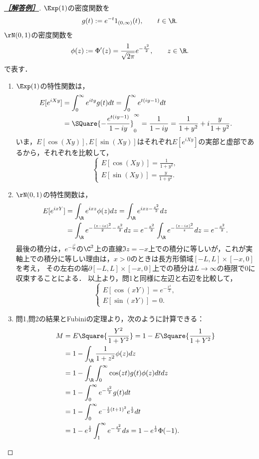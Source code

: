 \documentclass[uplatex,dvipdfmx]{jsarticle}
\begin{document}
\begin{proof}[\textbf{\underline{［解答例］}}]
    $\Exp(1)$の密度関数を
    \[g(t):=e^{-t}1_{(0,\infty)}(t),\qquad t\in\R.\]
    $\rN(0,1)$の密度関数を
    \[\phi(z):=\Phi'(z)=\frac{1}{\sqrt{2\pi}}e^{-\frac{z^2}{2}},\qquad z\in\R.\]
    で表す．
    \begin{enumerate}
        \item $\Exp(1)$の特性関数は，
        \begin{align*}
            E[e^{iXy}]&=\int^\infty_0e^{ity}g(t)dt
            =\int^\infty_0e^{t(iy-1)}dt\\
            &=\SQuare{-\frac{e^{t(iy-1)}}{1-iy}}^\infty_0=\frac{1}{1-iy}=\frac{1}{1+y^2}+i\frac{y}{1+y^2}.
        \end{align*}
        いま，$E[\cos(Xy)],E[\sin(Xy)]$はそれぞれ$E[e^{iXy}]$の実部と虚部であるから，それぞれを比較して，
        \[\begin{cases}
            E[\cos(Xy)]=\frac{1}{1+y^2},\\
            E[\sin(Xy)]=\frac{y}{1+y^2}.
        \end{cases}\]
        \item $\rN(0,1)$の特性関数は，
        \begin{align*}
            E[e^{ixY}]&=\int_\R e^{ixz}\phi(z)dz=\int_\R e^{ixz-\frac{z^2}{2}}dz\\
            &=\int_\R e^{-\frac{(z-ix)^2}{2}-\frac{x^2}{2}}dz=e^{-\frac{x^2}{2}}\int_\R e^{-\frac{(z-ix)^2}{z}}dz=e^{-\frac{x^2}{2}}.
        \end{align*}
        最後の積分は，$e^{-\frac{z^2}{2}}$の$\C^2$上の直線$\Im z=-x$上での積分に等しいが，これが実軸上での積分に等しい理由は，$x>0$のときは長方形領域$[-L,L]\times[-x,0]$を考え，
        その左右の端$\partial[-L,L]\times[-x,0]$上での積分は$L\to\infty$の極限で$0$に収束することによる．
        以上より，問1と同様に左辺と右辺を比較して，
        \[\begin{cases}
            E[\cos(xY)]=e^{-\frac{x^2}{2}},\\
            E[\sin(xY)]=0.
        \end{cases}\]
        \item 問1,問2の結果とFubiniの定理より，次のように計算できる：
        \begin{align*}
            M&=E\Square{\frac{Y^2}{1+Y^2}}
            =1-E\Square{\frac{1}{1+Y^2}}\\
            &=1-\int_\R\frac{1}{1+z^2}\phi(z)dz\\
            &=1-\int_\R\int^\infty_0\cos(zt)g(t)\phi(z)dtdz\\
            &=1-\int_0^\infty e^{-\frac{t^2}{2}}g(t)dt\\
            &=1-\int_0^\infty e^{-\frac{1}{2}(t+1)^2}e^{\frac{1}{2}}dt\\
            &=1-e^{\frac{1}{2}}\int^\infty_{1}e^{-\frac{s^2}{2}}ds=1-e^{\frac{1}{2}}\Phi(-1).
        \end{align*}
    \end{enumerate}
\end{proof}
\end{document}
